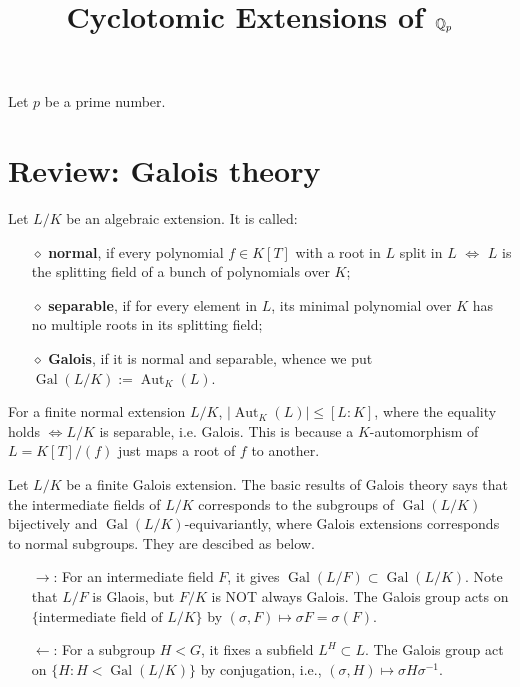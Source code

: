 \documentclass{article}
\title{Cyclotomic Extensions of $\mathbb{Q}_p$}
\author{}
\date{}
\theoremstyle{definition}
\theoremstyle{remark}
\DeclareMathOperator{\gal}{Gal}
\DeclareMathOperator{\aut}{Aut} %
\begin{document}
\maketitle

Let $p$ be a prime number.

\section{Review: Galois theory}
Let $L/K$ be an algebraic extension. It is called: \begin{enumerate}
    \item [$\diamond$]\textbf{normal}, if every polynomial $f\in K[T]$ with a root in $L$ split in $L$ $\iff$ $L$ is the splitting field of a bunch of polynomials over $K$;
    \item [$\diamond$]\textbf{separable}, if for every element in $L$, its minimal polynomial over $K$ has no multiple roots in its splitting field;
    \item [$\diamond$]\textbf{Galois}, if it is normal and separable, whence we put $\gal(L/K) := \aut_K(L)$.
\end{enumerate}
For a finite normal extension $L/K$, $|\aut_K(L)| \le [L:K]$, where the equality holds $\iff L/K$ is separable, i.e. Galois. This is because a $K$-automorphism of $L = K[T]/(f)$ just maps a root of $f$ to another.

Let $L/K$ be a finite Galois extension. The basic results of Galois theory says that the intermediate fields of $L/K$ corresponds to the subgroups of $\gal(L/K)$ bijectively and $\gal(L/K)$-equivariantly, where Galois extensions corresponds to normal subgroups.
They are descibed as below.
\begin{enumerate}
    \item [$\rightarrow$:] For an intermediate field $F$, it gives $\gal(L/F)\subset \gal(L/K)$. Note that $L/F$ is Glaois, but $F/K$ is NOT always Galois.
    The Galois group acts on $\{\text{intermediate field of } L/K\}$ by $(\sigma, F) \mapsto \sigma F = \sigma(F)$.
    \item [$\leftarrow$:] For a subgroup $H < G$, it fixes a subfield $L^H \subset L$. The Galois group act on $\{H : H < \gal(L/K)\}$ by conjugation, i.e., $(\sigma, H) \mapsto \sigma H\sigma^{-1}$.
\end{enumerate}
\end{document}
